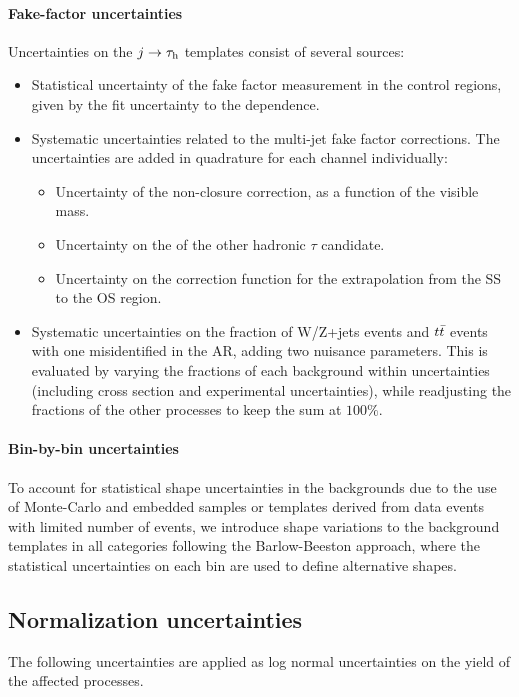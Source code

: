 \paragraph{Fake-factor uncertainties} Uncertainties on the $j \rightarrow \tau_{\rm h}$ templates consist of several sources:
\begin{itemize}
    \item Statistical uncertainty of the fake factor measurement in the control regions, given by the fit uncertainty to the \pt dependence.
    \item Systematic uncertainties related to the multi-jet fake factor corrections. The uncertainties are added in quadrature for each channel individually:
    \begin{itemize}
        \item Uncertainty of the non-closure correction, as a function of the visible mass.
        \item Uncertainty on the \pt of the other hadronic $\tau$ candidate.
        \item Uncertainty on the correction function for the extrapolation from the SS to the OS region.
    \end{itemize}
    \item Systematic uncertainties on the fraction of W/Z+jets events and $t\Bar{t}$ events with one misidentified \tauh in the AR, adding two nuisance parameters. This is evaluated by varying the fractions of each background within uncertainties (including cross section and experimental uncertainties), while readjusting the fractions of the other processes to keep the sum at $100\%$.
\end{itemize}

\paragraph{Bin-by-bin uncertainties} To account for statistical shape uncertainties in the backgrounds due to the use of Monte-Carlo and embedded samples or templates derived from data events with limited number of events, we introduce shape variations to the background templates in all categories following the Barlow-Beeston approach, where the statistical uncertainties on each bin are used to define alternative shapes.

\subsection{Normalization uncertainties}
The following uncertainties are applied as log normal uncertainties on the yield of the affected
processes.

